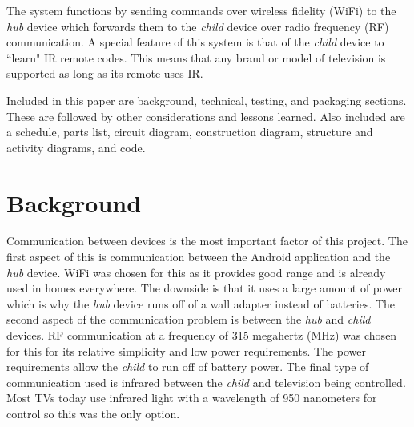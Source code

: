 \documentclass[12pt]{article}
\begin{document}
The system functions by sending commands over wireless fidelity (WiFi) to the \emph{hub} device which forwards them to the \emph{child} device over radio frequency (RF) communication. A special feature of this system is that of the \emph{child} device to ``learn" IR remote codes. This means that any brand or model of television is supported as long as its remote uses IR. 

Included in this paper are background, technical, testing, and packaging sections. These are followed by other considerations and lessons learned. Also included are a schedule, parts list, circuit diagram, construction diagram, structure and activity diagrams, and code. 

\section*{Background}
 Communication between devices is the most important factor of this project. The first aspect of this is communication between the Android application and the \emph{hub} device. WiFi was chosen for this as it provides good range and is already used in homes everywhere. The downside is that it uses a large amount of power which is why the \emph{hub} device runs off of a wall adapter instead of batteries. The second aspect of the communication problem is between the \emph{hub} and \emph{child} devices. RF communication at a frequency of 315 megahertz (MHz) was chosen for this for its relative simplicity and low power requirements. The power requirements allow the \emph{child} to run off of battery power. The final type of communication used is infrared between the \emph{child} and television being controlled. Most TVs today use infrared light with a wavelength of 950 nanometers for control so this was the only option.  
 
\end{document}
